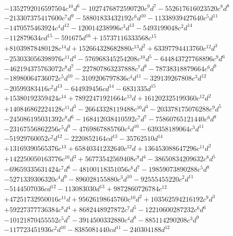 {\begin{align*}
&-1352792016597504c^{10}d^{6}-1027476872590720c^{9}d^{7}-552617616023520c^{8}d^{8}\\
&-213307375417600c^{7}d^{9}-58801833432192c^{6}d^{10}-11338939427640c^{5}d^{11}\\
&-1470575463924c^{4}d^{12}-120014238996c^{3}d^{13}-5493199048c^{2}d^{14}\\
&-112879634cd^{15}-591675d^{16}+15737116333568c^{15}\\
&+81039878480128c^{14}d+152664328682880c^{13}d^{2}+63397794413760c^{12}d^{3}\\
&-253033056398976c^{11}d^{4}-576968345254208c^{10}d^{5}-644843727768896c^{9}d^{6}\\
&-462194375763072c^{8}d^{7}-227807863237888c^{7}d^{8}-78738318879664c^{6}d^{9}\\
&-18980064736072c^{5}d^{10}-3109206797836c^{4}d^{11}-329139267808c^{3}d^{12}\\
&-20599383416c^{2}d^{13}-644939456cd^{14}-6831335d^{15}\\
&+15380192359424c^{14}+78922471921664c^{13}d+161202325199360c^{12}d^{2}\\
&+140846862224128c^{11}d^{3}-26643328119488c^{10}d^{4}-203378175076288c^{9}d^{5}\\
&-245086195031392c^{8}d^{6}-168412038410592c^{7}d^{7}-75860765121440c^{6}d^{8}\\
&-23167556862256c^{5}d^{9}-4769867885760c^{4}d^{10}-639358189064c^{3}d^{11}\\
&-51929760052c^{2}d^{12}-2220852164cd^{13}-35762510d^{14}\\
&+13169390565376c^{13}+65840341232640c^{12}d+136453088647296c^{11}d^{2}\\
&+142250050163776c^{10}d^{3}+56773542569408c^{9}d^{4}-38650834209632c^{8}d^{5}\\
&-69659335631424c^{7}d^{6}-48100118351056c^{6}d^{7}-19859073890288c^{5}d^{8}\\
&-5271339306320c^{4}d^{9}-896028155880c^{3}d^{10}-92555455220c^{2}d^{11}\\
&-5144507036cd^{12}-113083030d^{13}+9872860726784c^{12}\\
&+47251732950016c^{11}d+95626198645760c^{10}d^{2}+103562594216192c^{9}d^{3}\\
&+59227377736384c^{8}d^{4}+8682448927872c^{7}d^{5}-12210600287232c^{6}d^{6}\\
&-10121870455552c^{5}d^{7}-3914500332880c^{4}d^{8}-885114290208c^{3}d^{9}\\
&-117723451936c^{2}d^{10}-8385081440cd^{11}-240304188d^{12}\\

\end{align*}}
